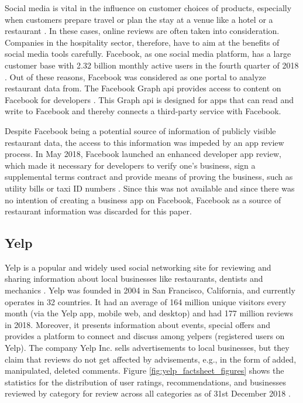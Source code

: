 \documentclass[a4paper, 11pt, oneside]{Thesis}  %
\begin{document}
Social media is vital in the influence on customer choices of products, especially when customers prepare travel or plan the stay at a venue like a hotel or a restaurant \cite{Kwok.2013}. In these cases, online reviews are often taken into consideration. Companies in the hospitality sector, therefore, have to aim at the benefits of social media tools carefully. Facebook, as one social media platform, has a large customer base with 2.32 billion monthly active users in the fourth quarter of 2018 \cite{statista.facebook.2019}. Out of these reasons, Facebook was considered as one portal to analyze restaurant data from. The Facebook Graph \ac{api} provides access to content on Facebook for developers \cite{facebook.graph.2019}. This Graph \ac{api} is designed for apps that can read and write to Facebook and thereby connects a third-party service with Facebook.

Despite Facebook being a potential source of information of publicly visible restaurant data, the access to this information was impeded by an app review process. In May 2018, Facebook launched an enhanced developer app review, which made it necessary for developers to verify one's business, sign a supplemental terms contract and provide means of proving the business, such as utility bills or taxi ID numbers \cite{KonstantinosPapamiltiadis.01.05.2018}. Since this was not available and since there was no intention of creating a business app on Facebook, Facebook as a source of restaurant information was discarded for this paper.

\subsection{Yelp}

Yelp is a popular and widely used social networking site for reviewing and sharing information about local businesses like restaurants, dentists and mechanics \cite{YelpInc..2018}. Yelp was founded in 2004 in San Francisco, California, and currently operates in 32 countries. It had an average of 164 million unique visitors every month (via the Yelp app, mobile web, and desktop) and had 177 million reviews in 2018. Moreover, it presents information about events, special offers and provides a platform to connect and discuss among yelpers (registered users on Yelp). The company Yelp Inc. sells advertisements to local businesses, but they claim that reviews do not get affected by advisements, e.g., in the form of added, manipulated, deleted comments. Figure \ref{fig:yelp_factsheet_figures} shows the statistics for the distribution of user ratings, recommendations, and businesses reviewed by category for review across all categories as of 31st December 2018 \cite{YelpInc..2018}.
\end{document}
